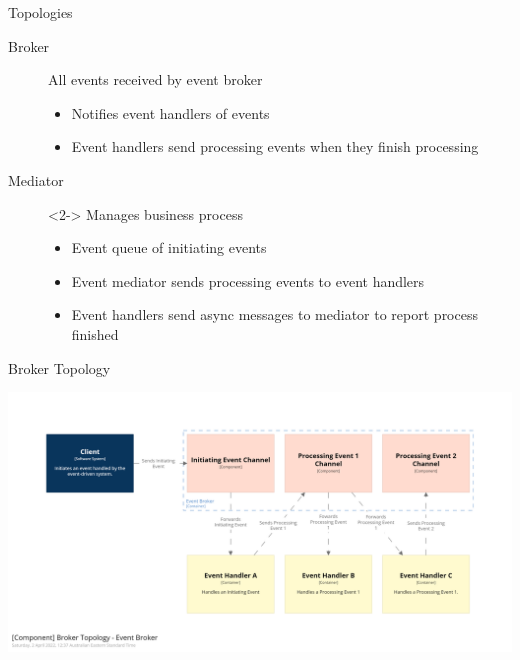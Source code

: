 \documentclass{slide}
\begin{document}
\begin{frame}{Topologies}
    \vspace{1mm}
    {\LARGE
    \begin{description}
        \item[Broker] All events received by event broker
        \begin{itemize}
            \Large\item Notifies event handlers of events
            \Large\item Event handlers send processing events when they finish processing
        \end{itemize}
        \vspace{3mm}
        \item[Mediator]<2-> Manages business process
        \begin{itemize}
            \Large\item Event queue of initiating events
            \Large\item Event mediator sends processing events to event handlers
            \Large\item Event handlers send async messages to mediator to report process finished
	\end{itemize}
    \end{description}
    }
\end{frame}

\begin{frame}{Broker Topology}
    \begin{adjustwidth}{-10mm}{-10mm}
        \centering
        \includegraphics[trim=195 195 195 195,clip,width=0.97\paperwidth]{../../notes/event/diagrams/broker-components.png}
    \end{adjustwidth}
\end{frame}
\end{document}
